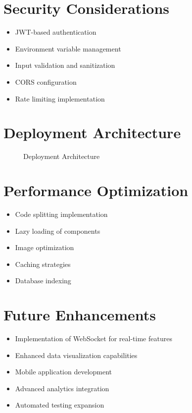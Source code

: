 \documentclass[12pt,a4paper]{article}
\begin{document}
\section{Security Considerations}
\begin{itemize}
    \item JWT-based authentication
    \item Environment variable management
    \item Input validation and sanitization
    \item CORS configuration
    \item Rate limiting implementation
\end{itemize}

\section{Deployment Architecture}
\begin{figure}[H]
\centering
{}
\caption{Deployment Architecture}
\end{figure}

\section{Performance Optimization}
\begin{itemize}
    \item Code splitting implementation
    \item Lazy loading of components
    \item Image optimization
    \item Caching strategies
    \item Database indexing
\end{itemize}

\section{Future Enhancements}
\begin{itemize}
    \item Implementation of WebSocket for real-time features
    \item Enhanced data visualization capabilities
    \item Mobile application development
    \item Advanced analytics integration
    \item Automated testing expansion
\end{itemize}
\end{document}
